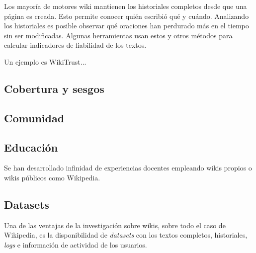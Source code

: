 \documentclass[11pt,onecolumn]{article}
\begin{document}
Los mayoría de motores wiki mantienen los historiales completos desde que una página es creada. Esto permite conocer quién escribió qué y cuándo. Analizando los historiales es posible observar qué oraciones han perdurado más en el tiempo sin ser modificadas. Algunas herramientas usan estos y otros métodos para calcular indicadores de fiabilidad de los textos.

Un ejemplo es WikiTrust...


\subsection{Cobertura y sesgos}





\subsection{Comunidad}



\subsection{Educación}




Se han desarrollado infinidad de experiencias docentes empleando wikis propios o wikis públicos como Wikipedia.

\subsection{Datasets}


Una de las ventajas de la investigación sobre wikis, sobre todo el caso de Wikipedia, es la disponibilidad de \emph{datasets} con los textos completos, historiales, \emph{logs} e información de actividad de los usuarios.
\end{document}
